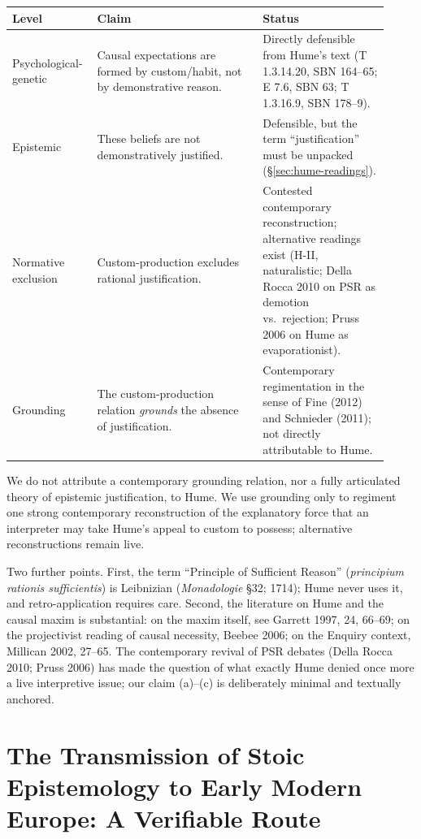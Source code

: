 \documentclass[11pt]{article}
\theoremstyle{plain}
\theoremstyle{definition}
\theoremstyle{remark}
\begin{document}
\begin{center}
\begin{tabular}{p{0.18\linewidth} p{0.42\linewidth} p{0.32\linewidth}}
\hline
\textbf{Level} & \textbf{Claim} & \textbf{Status} \\
\hline
Psychological-genetic &
Causal expectations are formed by custom/habit, not by demonstrative
reason. &
Directly defensible from Hume's text (T 1.3.14.20, SBN 164--65;
E 7.6, SBN 63; T 1.3.16.9, SBN 178--9). \\
Epistemic &
These beliefs are not demonstratively justified. &
Defensible, but the term ``justification'' must be unpacked
(\S\ref{sec:hume-readings}). \\
Normative exclusion &
Custom-production excludes rational justification. &
Contested contemporary reconstruction; alternative readings exist
(H-II, naturalistic; Della Rocca 2010 on PSR as demotion vs.\
rejection; Pruss 2006 on Hume as evaporationist). \\
Grounding &
The custom-production relation \emph{grounds} the absence of
justification. &
Contemporary regimentation in the sense of Fine (2012) and
Schnieder (2011); not directly attributable to Hume. \\
\hline
\end{tabular}
\end{center}

We do not attribute a contemporary grounding relation, nor a fully
articulated theory of epistemic justification, to Hume. We use
grounding only to regiment one strong contemporary reconstruction of
the explanatory force that an interpreter may take Hume's appeal to
custom to possess; alternative reconstructions remain live.

Two further points. First, the term ``Principle of Sufficient Reason''
(\emph{principium rationis sufficientis}) is Leibnizian
(\emph{Monadologie} \S32; 1714); Hume never uses it, and
retro-application requires care. Second, the literature on Hume and the
causal maxim is substantial: on the maxim itself, see Garrett 1997, 24,
66--69; on the projectivist reading of causal necessity, Beebee 2006;
on the Enquiry context, Millican 2002, 27--65. The contemporary revival
of PSR debates (Della Rocca 2010; Pruss 2006) has made the question of
what exactly Hume denied once more a live interpretive issue; our claim
(a)--(c) is deliberately minimal and textually anchored.

\section{The Transmission of Stoic Epistemology to Early Modern Europe:
A Verifiable Route}
\label{sec:transmission}
\end{document}
